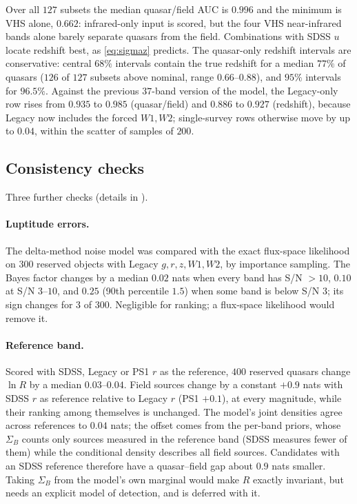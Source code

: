 \documentclass[11pt,a4paper]{article}
\newcommand{\Sb}{\Sigma_{B}}
\begin{document}
Over all $127$ subsets the median quasar/field AUC is $0.996$ and the minimum is
VHS alone, $0.662$: infrared-only input is scored, but the four VHS
near-infrared bands alone barely separate quasars from the field. Combinations with SDSS $u$ locate
redshift best, as \eqref{eq:sigmaz} predicts. The quasar-only redshift intervals
are conservative: central $68\%$ intervals contain the true redshift for a median
$77\%$ of quasars ($126$ of $127$ subsets above nominal, range $0.66$--$0.88$),
and $95\%$ intervals for $96.5\%$. Against the previous $37$-band
version of the model, the Legacy-only row rises from $0.935$ to $0.985$
(quasar/field) and $0.886$ to $0.927$ (redshift), because Legacy now includes the
forced $W1,W2$; single-survey rows otherwise move by up to $0.04$, within the
scatter of samples of $200$.

\subsection{Consistency checks}
\label{sec:health}

Three further checks (details in ).

\paragraph{Luptitude errors.} The delta-method noise model was compared with the
exact flux-space likelihood on $300$ reserved objects with Legacy
$g,r,z,W1,W2$, by importance sampling. The Bayes factor changes by a median
$0.02$ nats when every band has S/N $>10$, $0.10$ at S/N $3$--$10$, and $0.25$
(90th percentile $1.5$) when some band is below S/N $3$; its sign changes for $3$
of $300$. Negligible for ranking; a flux-space likelihood would remove it.

\paragraph{Reference band.} Scored with SDSS, Legacy or PS1 $r$ as the reference,
$400$ reserved quasars change $\ln R$ by a median $0.03$--$0.04$. Field sources
change by a constant $+0.9$ nats with SDSS $r$ as reference relative to Legacy
$r$ (PS1 $+0.1$), at every magnitude, while their ranking among themselves is
unchanged. The model's joint densities agree across references to $0.04$ nats;
the offset comes from the per-band priors, whose $\Sb$ counts only sources
measured in the reference band (SDSS measures fewer of them) while the
conditional density describes all field sources. Candidates with an SDSS
reference therefore have a quasar--field gap about $0.9$ nats smaller. Taking
$\Sb$ from the model's own marginal would make $R$ exactly invariant, but needs
an explicit model of detection, and is deferred with it.
\end{document}
